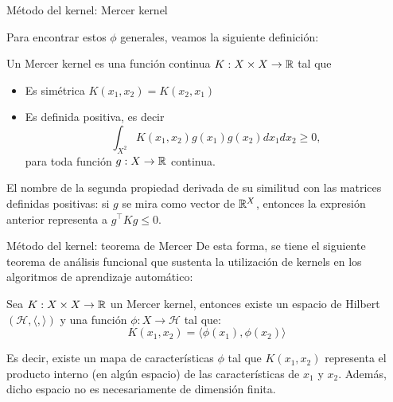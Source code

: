 \documentclass[9pt, handout]{beamer}
\begin{document}
\begin{frame}{Método del kernel: Mercer kernel}

Para encontrar estos $\phi$ generales, veamos la siguiente definición:

\begin{definition}
    Un Mercer kernel es una función continua $K: X\times X \to \mathbb{R}$ tal que
\begin{itemize}
    \item Es simétrica $K(x_1 , x_2 ) = K (x_2 , x_1)$
    \item Es definida positiva, es decir
    $$\int_{X^2} K(x_1, x_2)g(x_1) g(x_2) dx_1 dx_2\geq 0,$$
    para toda función $g:X\rightarrow\mathbb{R}$ continua. 
\end{itemize}

\end{definition} \pause

El nombre de la segunda propiedad derivada de su similitud con las matrices definidas positivas: si $g$ se mira como vector de $\mathbb{R}^X$, entonces la expresión anterior representa a $g^\top Kg\leq 0$.

\end{frame}

\begin{frame}{Método del kernel: teorema de Mercer}
	De esta forma, se tiene el siguiente teorema de análisis funcional que sustenta la utilización de kernels en los algoritmos de aprendizaje automático:

\begin{theorem}
	Sea $K: X\times X \to \mathbb{R}$ un Mercer kernel, entonces existe un espacio de Hilbert $\left(\mathcal{H},\langle,\rangle\right)$ y una función $\phi: X \to \mathcal{H}$ tal que:
	\begin{equation*}
    K(x_1, x_2) = \langle \phi(x_1) , \phi(x_2) \rangle
\end{equation*}
\end{theorem} \pause

Es decir, existe un mapa de características $\phi$ tal que $K(x_1, x_2)$ representa el producto interno (en algún espacio) de las características de $x_1$ y $x_2$. Además, dicho espacio no es necesariamente de dimensión finita.
\end{frame}
\end{document}
